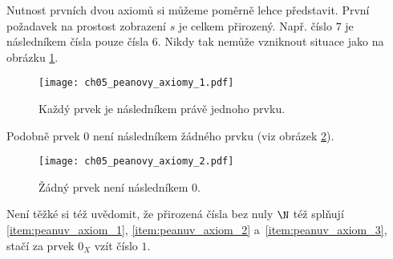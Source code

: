 Nutnost prvních dvou axiomů si můžeme poměrně lehce představit. První požadavek na prostost zobrazení $s$ je celkem přirozený. Např. číslo $7$ je následníkem čísla pouze čísla $6$. Nikdy tak nemůže vzniknout situace jako na obrázku \ref{fig:peanovy_axiomy_1}.
\begin{figure}[H]
	\centering
	\texttt{[image: ch05\_peanovy\_axiomy\_1.pdf]}
    \caption{Každý prvek je následníkem právě jednoho prvku.}
    \label{fig:peanovy_axiomy_1}
\end{figure}
Podobně prvek $0$ není následníkem žádného prvku (viz obrázek \ref{fig:peanovy_axiomy_2}).
\begin{figure}[H]
	\centering
	\texttt{[image: ch05\_peanovy\_axiomy\_2.pdf]}
    \caption{Žádný prvek není následníkem 0.}
    \label{fig:peanovy_axiomy_2}
\end{figure}
Není těžké si též uvědomit, že přirozená čísla bez nuly $\N$ též splňují \ref{item:peanuv_axiom_1}, \ref{item:peanuv_axiom_2} a~\ref{item:peanuv_axiom_3}, stačí za prvek $0_X$ vzít číslo $1$.